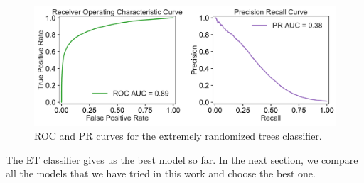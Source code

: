 \documentclass[12pt]{article}
\begin{document}
 \begin{figure}[!h]
\begin{center}
\includegraphics[width=6in]{ET_ROC_PR_plots.pdf}
\end{center}
\caption{\label{fig:ET}
ROC and PR curves for the extremely randomized trees classifier.}
\end{figure}
The ET classifier gives us the best model so far. In the next section, we compare all the models that we have tried in this work and choose the best one.
\end{document}
